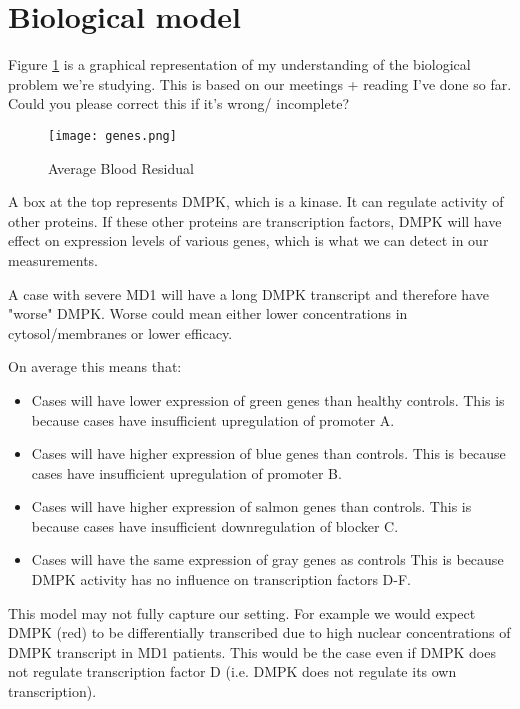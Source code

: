 \documentclass[12pt]{article}
\begin{document}
\maketitle

\section{Biological model}

Figure \ref{genes} is a graphical representation of my understanding of the biological problem we're studying. This is based on our meetings + reading I've done so far. Could you please correct this if it's wrong/ incomplete?

\begin{figure}[!htb]
\centering
\texttt{[image: genes.png]}
\caption{Average Blood Residual \label{genes}}
\end{figure}

A box at the top represents DMPK, which is a kinase. It can regulate activity of other proteins. If these other proteins are transcription factors, DMPK will have effect on expression levels of various genes, which is what we can detect in our measurements.

A case with severe MD1 will have a long DMPK transcript and therefore have "worse" DMPK. Worse could mean either lower concentrations in cytosol/membranes or lower efficacy.

On average this means that:
\begin{itemize}
  \item Cases will have lower expression of green genes than healthy controls. This is because cases have insufficient upregulation of promoter A.
  \item Cases will have higher expression of blue genes than controls. This is because cases have insufficient upregulation of promoter B.
  \item Cases will have higher expression of salmon genes than controls. This is because cases have insufficient downregulation of blocker C.
  \item Cases will have the same expression of gray genes as controls This is because DMPK activity has no influence on transcription factors D-F.
\end{itemize}

This model may not fully capture our setting. For example we would expect DMPK (red) to be differentially transcribed due to high nuclear concentrations of DMPK transcript in MD1 patients. This would be the case even if DMPK does not regulate transcription factor D (i.e. DMPK does not regulate its own transcription).
\end{document}
